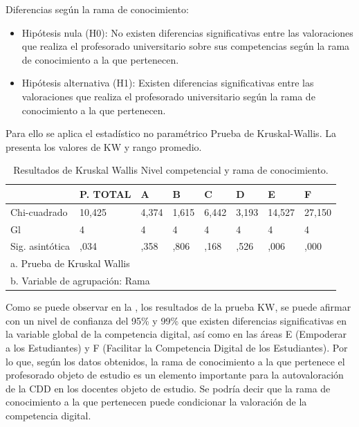 \documentclass[spanish]{textolivre}
\begin{document}
Diferencias según la rama de conocimiento:

\begin{itemize}
    \item Hipótesis nula (H0): No existen diferencias significativas entre las valoraciones que realiza el profesorado universitario sobre sus competencias según la rama de conocimiento a la que pertenecen.
    \item Hipótesis alternativa (H1): Existen diferencias significativas entre las valoraciones que realiza el profesorado universitario según la rama de conocimiento a la que pertenecen.
\end{itemize}

Para ello se aplica el estadístico no paramétrico Prueba de Kruskal-Wallis. La  presenta los valores de KW y rango promedio.

\begin{table}[htpb]
\caption{Resultados de Kruskal Wallis Nivel competencial y rama de conocimiento.}
\label{tab9}
\centering
\begin{tabular}{p{}p{}p{}p{}p{}p{}p{}p{}}
\toprule
& P. TOTAL & A & B & C & D & E & F
\\
\midrule
Chi-cuadrado & 10,425 & 4,374 & 1,615 & 6,442 & 3,193 & 14,527 & 27,150
\\
Gl & 4 & 4 & 4 & 4 & 4 & 4 & 4
\\
Sig. asintótica & ,034 & ,358 & ,806 & ,168 & ,526 & ,006 & ,000
\\
\multicolumn{8}{l}{a. Prueba de Kruskal Wallis}
\\
\multicolumn{8}{l}{b. Variable de agrupación: Rama}
\\ 
\bottomrule
\end{tabular}
\end{table}

Como se puede observar en la , los resultados de la prueba KW, se puede afirmar con un nivel de confianza del 95\% y 99\% que existen diferencias significativas en la variable global de la competencia digital, así como en las áreas E (Empoderar a los Estudiantes) y F (Facilitar la Competencia Digital de los Estudiantes). Por lo que, según los datos obtenidos, la rama de conocimiento a la que pertenece el profesorado objeto de estudio es un elemento importante para la autovaloración de la CDD en los docentes objeto de estudio. Se podría decir que la rama de conocimiento a la que pertenecen puede condicionar la valoración de la competencia digital.
\end{document}
